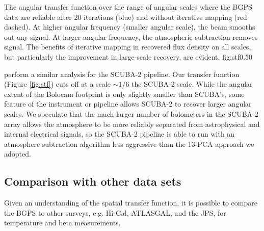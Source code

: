 {The angular transfer function over the range of angular scales where the BGPS
data are reliable after 20 iterations (blue) and without iterative mapping (red dashed).
At higher angular %
frequency (smaller angular scale), the beam smooths out any signal.  At larger
angular frequency, the atmospheric subtraction removes signal. 
The benefits of iterative mapping in recovered flux density on all scales, but
particularly the improvement in large-scale recovery, are evident.
}
{fig:stf}{0.5}{0}

\citet{Chapin2013a} perform a similar analysis for the SCUBA-2 pipeline.  Our
transfer function (Figure \ref{fig:stf}) cuts off at a scale $\sim 1/6$ the
SCUBA-2 scale.  While the angular extent of the Bolocam
footprint is only slightly smaller than SCUBA's, some feature of the instrument
or pipeline allows SCUBA-2 to recover larger angular scales.  We speculate that
the much larger number of bolometers in the SCUBA-2 array allows the atmosphere
to be more reliably separated from astrophysical and internal electrical
signals, so the SCUBA-2 pipeline is able to run with an atmosphere subtraction
algorithm less aggressive than the 13-PCA approach we adopted.





\subsection{Comparison with other data sets}
\label{sec:otherdata}
Given an understanding of the spatial transfer function, it is possible to
compare the BGPS to other surveys, e.g.  Hi-Gal, ATLASGAL, and the JPS, for
temperature and beta measurements.

